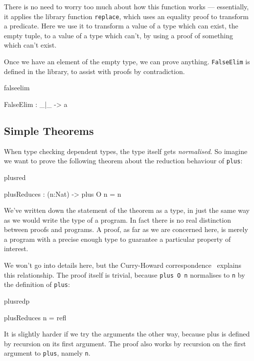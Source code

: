 \noindent
There is no need to worry too much about how this function works --- essentially,
it applies the library function \texttt{replace}, which uses an equality proof to 
transform a predicate. Here we use it to transform a value of a type which can exist,
the empty tuple, to a value of a type which can't, by using a proof of something
which can't exist.

Once we have an element of the empty type, we can prove anything. \texttt{FalseElim}
is defined in the library, to assist with proofs by contradiction.

\begin{SaveVerbatim}{falseelim}

FalseElim : _|_ -> a

\end{SaveVerbatim}

\subsection{Simple Theorems}

When type checking dependent types, the type itself gets \emph{normalised}. So imagine
we want to prove the following theorem about the reduction behaviour of \texttt{plus}:

\begin{SaveVerbatim}{plusred}

plusReduces : (n:Nat) -> plus O n = n

\end{SaveVerbatim}

\noindent
We've written down the statement of the theorem as a type, in just the same way
as we would write the type of a program. In fact there is no real distinction
between proofs and programs. A proof, as far as we are concerned here, is
merely a program with a precise enough type to guarantee a particular property
of interest.

We won't go into details here, but the Curry-Howard
correspondence~\cite{howard} explains this relationship.
The proof itself is trivial, because \texttt{plus O n} normalises to \texttt{n} 
by the definition of \texttt{plus}:

\begin{SaveVerbatim}{plusredp}

plusReduces n = refl

\end{SaveVerbatim}

\noindent
It is slightly harder if we try the arguments the other way, because plus is
defined by recursion on its first argument. The proof also works by recursion
on the first argument to \texttt{plus}, namely \texttt{n}.

